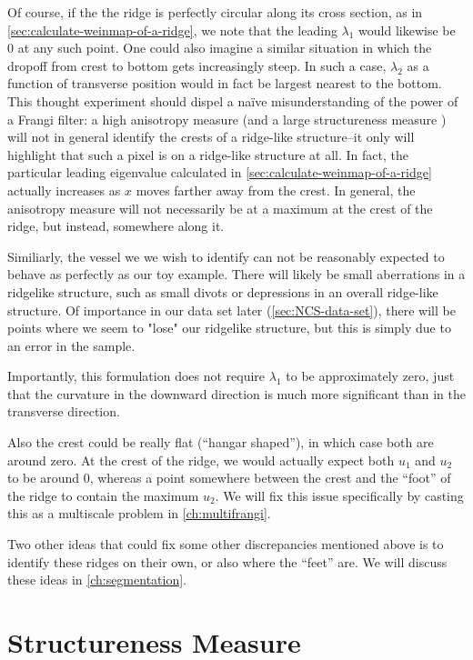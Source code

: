 Of course, if the the ridge is perfectly circular along its cross section, as in \cref{sec:calculate-weinmap-of-a-ridge}, we note that the leading  $\lambda_1$ would likewise be 0 at any such point.  One could also imagine a similar situation in which the dropoff from crest to bottom gets increasingly steep. In such a case, $\lambda_2$ as a function of transverse position would in fact be largest nearest to the bottom. This thought experiment should dispel a na\"{i}ve misunderstanding of the power of a Frangi filter: a high anisotropy measure (and a large structureness measure ) will not in general identify the crests of a ridge-like structure--it only will highlight that such a pixel is on a ridge-like structure at all. In fact, the particular leading eigenvalue calculated in \cref{sec:calculate-weinmap-of-a-ridge} actually increases as $x$ moves farther away from the crest. In general, the anisotropy measure will not necessarily be at a maximum at the crest of the ridge, but instead, somewhere along it.

Similiarly, the vessel we we wish to identify can not be reasonably expected to behave as perfectly as our toy example. There will likely be small aberrations in a ridgelike structure, such as small divots or depressions in an overall ridge-like structure. Of importance in our data set later (\cref{sec:NCS-data-set}), there will be points where we seem to "lose" our ridgelike structure,
but this is simply due to an error in the sample.

Importantly, this formulation does not require $\lambda_1$ to be approximately zero, just that the curvature in the downward direction is much more significant than in the transverse direction.

Also the crest could be really flat (``hangar shaped''), in which case both are around zero. At the crest of the ridge, we would actually expect both $u_1$ and $u_2$ to be around 0, whereas a point somewhere between the crest and the ``foot'' of the ridge to contain the maximum $u_2$. We will fix this issue specifically by casting this as a multiscale problem in \cref{ch:multifrangi}.

Two other ideas that could fix some other discrepancies mentioned above is to identify these ridges on their own, or also where the ``feet'' are. We will discuss these ideas in \cref{ch:segmentation}.

\section{Structureness Measure} \label{sec:frangi-structureness}

